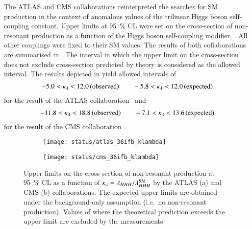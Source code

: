 The ATLAS and CMS collaborations reinterpreted the searches for SM \HH
production in the context of anomalous values of the trilinear Higgs boson
self-coupling constant. Upper limits at \SI{95}{\percent} CL were set on the
cross-section of non-resonant \HH production as a function of the Higgs boson
self-coupling modifier, \klambda. All other couplings were fixed to their SM
values. The results of both collaborations are summarised in
. The \klambda interval in which the upper limit
on the cross-section does not exclude cross-section predicted by theory is
considered as the allowed \klambda interval. The results depicted in
 yield allowed \klambda intervals of
\begin{align*}
  -5.0 < \kappa_{\lambda} < 12.0 \,\text{(observed)} \qquad -5.8 < \kappa_{\lambda} < 12.0 \,\text{(expected)}
\end{align*}
for the result of the ATLAS collaboration~\cite{HDBS-2018-58} and
\begin{align*}
  -11.8 < \kappa_{\lambda} < 18.8 \,\text{(observed)} \qquad -7.1 < \kappa_{\lambda} < 13.6 \,\text{(expected)}
\end{align*}
for the result of the CMS collaboration~\cite{CMS-HIG-17-030}.

\begin{figure}[htbp]
  \centering

  \begin{subfigure}[b]{0.48\textwidth}
    \centering

    \texttt{[image: status/atlas\_36ifb\_klambda]}

  \end{subfigure}\hfill%
  \begin{subfigure}[b]{0.48\textwidth}
    \centering

    \texttt{[image: status/cms\_36ifb\_klambda]}

  \end{subfigure}

  \caption{Upper limits on the cross-section of non-resonant \HH production at
    \SI{95}{\percent} CL as a function of
    $\kappa_{\lambda} = \lambda_{HHH} / \lambda_{HHH}^{\text{SM}}$ by the ATLAS (a) and
    CMS (b) collaborations. The expected upper limits are obtained under the
    background-only assumption (i.e.\ no non-resonant \HH production). Values of
    \klambda where the theoretical prediction exceeds the upper limit are
    excluded by the measurements.}%
  \label{fig:prior_status_klambda}
\end{figure}


